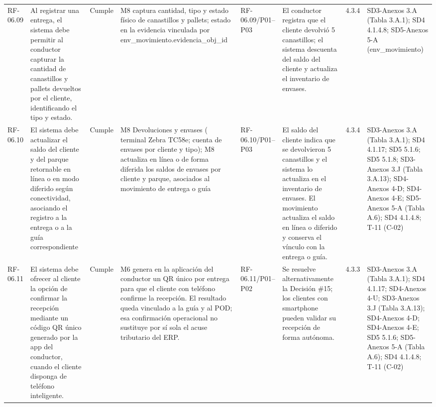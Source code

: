 \documentclass[oficio,firma,final]{lafrox}
\begin{document}
\begin{landscape}
{\begin{longtable}{@{}F{0.054} F{0.173} F{0.061} F{0.191} F{0.106} F{0.180} F{0.067} F{0.168}@{}}
  RF-06.09 & Al registrar una entrega, el sistema debe permitir al conductor capturar la cantidad de canastillos y pallets devueltos por el cliente, identificando el tipo y estado. & Cumple & M8 captura cantidad, tipo y estado físico de canastillos y pallets; estado en la evidencia vinculada por env\_movimiento.evidencia\_obj\_id & RF-06.09/\allowbreak{}P01--\allowbreak{}P03 & El conductor registra que el cliente devolvió 5 canastillos; el sistema descuenta del saldo del cliente y actualiza el inventario de envases. & 4.3.4 & SD3-Anexos 3.A (Tabla 3.A.1); SD4 4.1.4.8; SD5-Anexos 5-A (env\_movimiento)  \\
  RF-06.10 & El sistema debe actualizar el saldo del cliente y del parque retornable en línea o en modo diferido según conectividad, asociando el registro a la entrega o a la guía correspondiente & Cumple & M8 Devoluciones y envases ( terminal Zebra TC58e; cuenta de envases por cliente y tipo); M8 actualiza en línea o de forma diferida los saldos de envases por cliente y parque, asociados al movimiento de entrega o guía & RF-06.10/\allowbreak{}P01--\allowbreak{}P03 & El saldo del cliente indica que se devolvieron 5 canastillos y el sistema lo actualiza en el inventario de envases. El movimiento actualiza el saldo en línea o diferido y conserva el vínculo con la entrega o guía. & 4.3.4 & SD3-Anexos 3.A (Tabla 3.A.1); SD4 4.1.17; SD5 5.1.6; SD5 5.1.8; SD3-Anexos 3.J (Tabla 3.A.13); SD4-Anexos 4-D; SD4-Anexos 4-E; SD5-Anexos 5-A (Tabla A.6); SD4 4.1.4.8; T-11 (C-02)  \\
  RF-06.11 & El sistema debe ofrecer al cliente la opción de confirmar la recepción mediante un código QR único generado por la app del conductor, cuando el cliente disponga de teléfono inteligente. & Cumple & M6 genera en la aplicación del conductor un QR único por entrega para que el cliente con teléfono confirme la recepción. El resultado queda vinculado a la guía y al POD; esa confirmación operacional no sustituye por sí sola el acuse tributario del ERP. & RF-06.11/\allowbreak{}P01--\allowbreak{}P02 & Se resuelve alternativamente la Decisión \#15; los clientes con smartphone pueden validar su recepción de forma autónoma. & 4.3.3 & SD3-Anexos 3.A (Tabla 3.A.1); SD4 4.1.17; SD4-Anexos 4-U; SD3-Anexos 3.J (Tabla 3.A.13); SD4-Anexos 4-D; SD4-Anexos 4-E; SD5 5.1.6; SD5-Anexos 5-A (Tabla A.6); SD4 4.1.4.8; T-11 (C-02)  \\

\end{longtable}}
\end{landscape}
\end{document}
